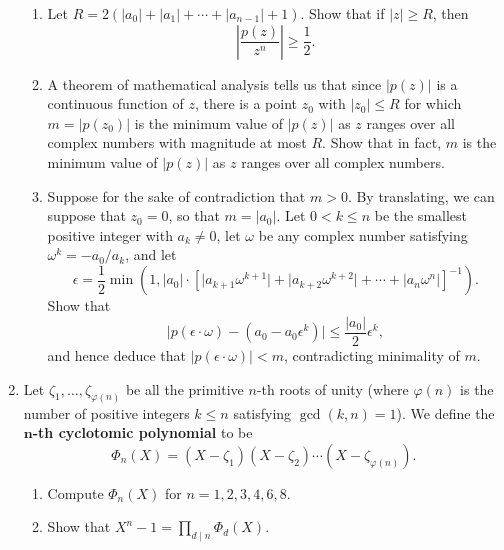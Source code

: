 \begin{enumerate}
\begin{enumerate}
\item Let $R = 2(\lvert a_0\rvert + \lvert a_1\rvert + \cdots + \lvert a_{n - 1}\rvert + 1)$. Show that if $\lvert z\rvert\geq R$, then 
\begin{equation*}
\left\lvert\frac{p(z)}{z^n}\right\rvert\geq\frac{1}{2}.
\end{equation*}
\item A theorem of mathematical analysis tells us that since $\lvert p(z)\rvert$ is a continuous function of $z$, there is a point $z_0$ with $\lvert z_0\rvert\leq R$ for which $m = \lvert p(z_0)\rvert$ is the minimum value of $\lvert p(z)\rvert$ as $z$ ranges over all complex numbers with magnitude at most $R$. Show that in fact, $m$ is the minimum value of $\lvert p(z)\rvert$ as $z$ ranges over all complex numbers.
\item Suppose for the sake of contradiction that $m > 0$. By translating, we can suppose that $z_0 = 0$, so that $m = \lvert a_0\rvert$. Let $0 < k\leq n$ be the smallest positive integer with $a_k\neq 0$, let $\omega$ be any complex number satisfying $\omega^k = -a_0/a_k$, and let 
\begin{equation*}
\epsilon = \frac{1}{2}\min\left(1, \lvert a_0\rvert\cdot\left[\lvert a_{k + 1}\omega^{k + 1}\rvert + \lvert a_{k + 2}\omega^{k + 2}\rvert + \cdots + \lvert a_n\omega^n\rvert\right]^{-1}\right).
\end{equation*}
Show that
\begin{equation*}
\lvert p(\epsilon\cdot\omega) - (a_0 - a_0\epsilon^k)\rvert\leq\frac{\lvert a_0\rvert}{2}\epsilon^k,
\end{equation*}
and hence deduce that $\lvert p(\epsilon\cdot\omega)\rvert < m$, contradicting minimality of $m$.
\end{enumerate}
\item Let $\zeta_1, \ldots, \zeta_{\varphi(n)}$ be all the primitive $n$-th roots of unity (where $\varphi(n)$ is the number of positive integers $k\leq n$ satisfying $\gcd(k,n) = 1$). We define the $\boldsymbol n$\textbf{-th cyclotomic polynomial} to be
\begin{equation*}
\Phi_n(X) = (X - \zeta_1)(X - \zeta_2)\cdots (X - \zeta_{\varphi(n)}).
\end{equation*}
\begin{enumerate}
\item Compute $\Phi_n(X)$ for $n = 1, 2, 3, 4, 6, 8$.
\item Show that $X^n - 1 = \prod_{d\mid n}\Phi_d(X)$.

\end{enumerate}
\end{enumerate}
